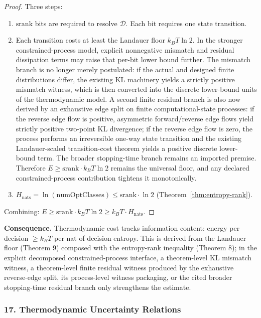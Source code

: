 \begin{proof}
Three steps:
\begin{enumerate}
\item $\mathrm{srank}$ bits are required to resolve $\mathcal{D}$. Each bit requires one state transition.
\item Each transition costs at least the Landauer floor $k_B T \ln 2$. In the stronger constrained-process model, explicit nonnegative mismatch and residual dissipation terms may raise that per-bit lower bound further. The mismatch branch is no longer merely postulated: if the actual and designed finite distributions differ, the existing KL machinery yields a strictly positive mismatch witness, which is then converted into the discrete lower-bound units of the thermodynamic model. A second finite residual branch is also now derived by an exhaustive edge split on finite computational-state processes: if the reverse edge flow is positive, asymmetric forward/reverse edge flows yield strictly positive two-point KL divergence; if the reverse edge flow is zero, the process performs an irreversible one-way state transition and the existing Landauer-scaled transition-cost theorem yields a positive discrete lower-bound term. The broader stopping-time branch remains an imported premise. Therefore $E \geq \mathrm{srank} \cdot k_B T \ln 2$ remains the universal floor, and any declared constrained-process contribution tightens it monotonically.
\item $H_{\mathrm{nats}} = \ln(\mathrm{numOptClasses}) \leq \mathrm{srank} \cdot \ln 2$ (Theorem~\ref{thm:entropy-rank}).
\end{enumerate}
Combining: $E \geq \mathrm{srank} \cdot k_B T \ln 2 \geq k_B T \cdot H_{\mathrm{nats}}$.
\end{proof}

\noindent\textbf{Consequence.} Thermodynamic cost tracks information content: energy per decision $\geq k_B T$ per nat of decision entropy. This is derived from the Landauer floor (Theorem 9) composed with the entropy-rank inequality (Theorem 8); in the explicit decomposed constrained-process interface, a theorem-level KL mismatch witness, a theorem-level finite residual witness produced by the exhaustive reverse-edge split, its process-level witness packaging, or the cited broader stopping-time residual branch only strengthens the estimate.

\subsubsection{17. Thermodynamic Uncertainty Relations}

